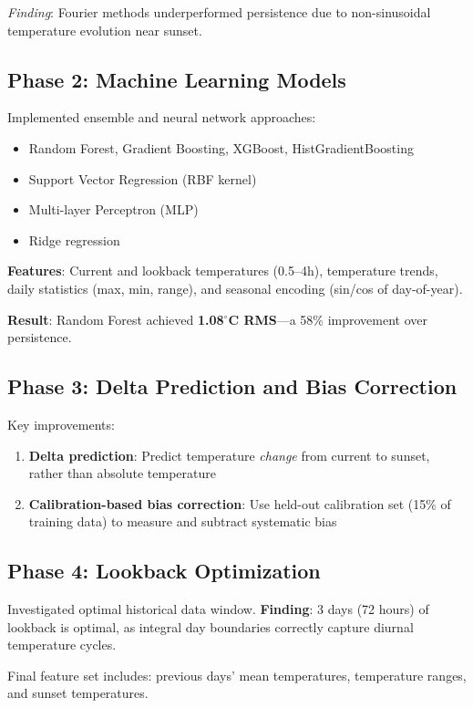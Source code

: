 \documentclass[11pt,letterpaper]{article}
\begin{document}
\textit{Finding}: Fourier methods underperformed persistence due to non-sinusoidal temperature evolution near sunset.

\subsection{Phase 2: Machine Learning Models}
Implemented ensemble and neural network approaches:
\begin{itemize}[noitemsep]
    \item Random Forest, Gradient Boosting, XGBoost, HistGradientBoosting
    \item Support Vector Regression (RBF kernel)
    \item Multi-layer Perceptron (MLP)
    \item Ridge regression
\end{itemize}

\textbf{Features}: Current and lookback temperatures (0.5--4h), temperature trends, daily statistics (max, min, range), and seasonal encoding (sin/cos of day-of-year).

\textbf{Result}: Random Forest achieved \textbf{1.08$^\circ$C RMS}---a 58\% improvement over persistence.

\subsection{Phase 3: Delta Prediction and Bias Correction}
Key improvements:
\begin{enumerate}[noitemsep]
    \item \textbf{Delta prediction}: Predict temperature \textit{change} from current to sunset, rather than absolute temperature
    \item \textbf{Calibration-based bias correction}: Use held-out calibration set (15\% of training data) to measure and subtract systematic bias
\end{enumerate}

\subsection{Phase 4: Lookback Optimization}
Investigated optimal historical data window. \textbf{Finding}: 3 days (72 hours) of lookback is optimal, as integral day boundaries correctly capture diurnal temperature cycles.

Final feature set includes: previous days' mean temperatures, temperature ranges, and sunset temperatures.
\end{document}
